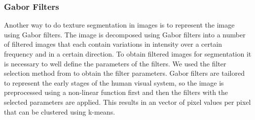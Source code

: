 \documentclass[pdftex,12pt,a4paper]{report}
\begin{document}
\subsubsection{Gabor Filters}

Another way to do texture segmentation in images is to represent the image using Gabor filters. The image is decomposed using Gabor filters into a number of filtered images that each contain variations in intensity over a certain frequency and in a certain direction. To obtain filtered images for segmentation it is necessary to well define the parameters of the filters. We used the filter selection method from \cite{jain1990unsupervised} to obtain the filter parameters. Gabor filters are tailored to represent the early stages of the human visual system, so the image is preprocessed using a non-linear function first and then the filters with the selected parameters are applied. This results in an vector of pixel values per pixel that can be clustered using k-means.
\end{document}
